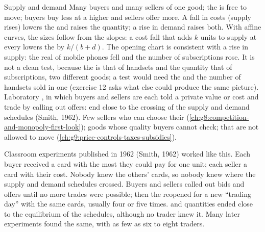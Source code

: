 \begin{model}{Supply and demand}
\assumes Many buyers and many sellers of one good; the  is free to move; buyers buy less at a
higher  and sellers offer more.
\predicts A fall in costs (supply rises) lowers the  and raises the quantity; a rise in demand
raises both. With affine curves, the sizes follow from the slopes: a cost fall that adds $k$ units to
supply at every  lowers the  by $k/(b+d)$.
\tested The opening chart is consistent with a rise in supply: the real  of mobile phones fell
and the number of subscriptions rose. It is not a clean test, because the  is that of handsets
and the quantity that of subscriptions, two different goods; a test would need the  and the
number of handsets sold in one  (exercise 12 asks what else could produce the same picture). Laboratory , in which buyers and sellers are each told a private
value or cost and trade by calling out offers:  end close to the crossing of the supply and
demand schedules (Smith, 1962).
\breaks Few sellers who can choose their  (\cref{ch:g8:competition-and-monopoly-first-look});
goods whose quality buyers cannot check;  that are not allowed to move
(\cref{ch:g9:price-controls-taxes-subsidies}).
\end{model}

\begin{record}
Classroom experiments published in 1962 (Smith, 1962) worked like this. Each buyer received a card
with the most they could pay for one unit; each seller a card with their cost. Nobody knew the others' cards,
so nobody knew where the supply and demand schedules crossed. Buyers and sellers called out bids and
offers until no more trades were possible; then the  reopened for a new ``trading day'' with the
same cards, usually four or five times.  and quantities ended close to the equilibrium of the
schedules, although no trader knew it. Many later experiments found the same, with as few as six to
eight traders.
\end{record}

